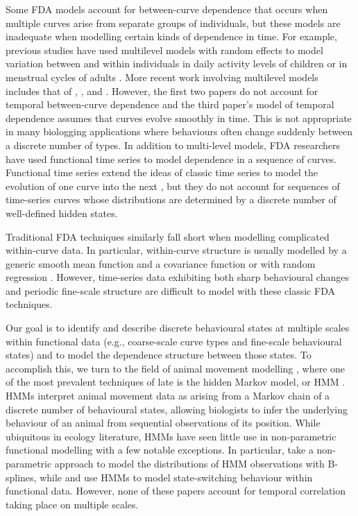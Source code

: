 Some FDA models account for between-curve dependence that occurs when multiple curves arise from separate groups of individuals, but these models are inadequate when modelling certain kinds of dependence in time. For example, previous studies have used multilevel models with random effects to model variation between and within individuals in daily activity levels of children \citep{Morris:2007} or in menstrual cycles of adults \citep{Bromback:1998}. More recent work involving multilevel models includes that of \citet{Di:2009}, \citet{Crainiceanu:2009}, and \citet{Chen:2012}. %
However, the first two papers do not account for temporal between-curve dependence and the third paper's model of temporal dependence assumes that curves evolve smoothly in time. This is not appropriate in many biologging applications where behaviours often change suddenly between a discrete number of types.
In addition to multi-level models, FDA researchers have used functional time series to model dependence in a sequence of curves. Functional time series extend the ideas of classic time series to model the evolution of one curve into the next \citep{Kokoszka:2018}, but they do not account for sequences of time-series curves whose distributions are determined by a discrete number of well-defined hidden states.

Traditional FDA techniques similarly fall short when modelling complicated within-curve data. In particular, within-curve structure is usually modelled by a generic smooth mean function and a covariance function \citep{Yao:2005} or with random regression \citep{Rice:2001}. However, time-series data exhibiting both sharp behavioural changes and periodic fine-scale structure are difficult to model with these classic FDA techniques.

Our goal is to identify and describe discrete behavioural states at multiple scales within functional data (e.g., coarse-scale curve types and fine-scale behavioural states) and to model the dependence structure between those states. To accomplish this, we turn to the field of animal movement modelling \citep{Hooten:2017}, where one of the most prevalent techniques of late is the hidden Markov model, or HMM \citep{Patterson:2017,McClintock:2020}. HMMs interpret animal movement data as arising from a Markov chain of a discrete number of behavioural states, allowing biologists to infer the underlying behaviour of an animal from sequential observations of its position. While ubiquitous in ecology literature, HMMs have seen little use in non-parametric functional modelling with a few notable exceptions. In particular, \citet{Langrock:2018} take a non-parametric approach to model the distributions of HMM observations with B-splines, while \citet{DeSouza:2014} and \citet{DeSouza:2017} use HMMs to model state-switching behaviour within functional data. However, none of these papers account for temporal correlation taking place on multiple scales. 

